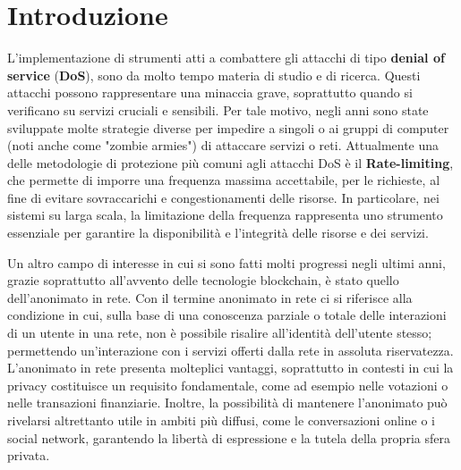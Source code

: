 \chapter*{Introduzione}
\label{chap:introduction}

L’implementazione di strumenti atti a combattere gli attacchi di tipo \textbf{denial of service} (\textbf{DoS}), sono da molto
tempo materia di studio e di ricerca. Questi attacchi possono rappresentare una minaccia grave, soprattutto quando si
verificano su servizi cruciali e sensibili. Per tale motivo, negli anni sono state sviluppate molte strategie diverse
per impedire a singoli o ai gruppi di computer (noti anche come "zombie armies") di attaccare servizi o reti.
Attualmente una delle metodologie di protezione più comuni agli attacchi DoS è il \textbf{Rate-limiting}, che permette
di imporre una frequenza massima accettabile, per le richieste, al fine di evitare sovraccarichi e congestionamenti delle
risorse. In particolare, nei sistemi su larga scala, la limitazione della frequenza rappresenta uno strumento essenziale
per garantire la disponibilità e l'integrità delle risorse e dei servizi.

Un altro campo di interesse in cui si sono fatti molti progressi negli ultimi anni, grazie soprattutto all'avvento delle
tecnologie blockchain, è stato quello dell’anonimato in rete. Con il termine anonimato in rete ci si riferisce alla
condizione in cui, sulla base di una conoscenza parziale o totale delle interazioni di un utente in una rete, non è
possibile risalire all'identità dell'utente stesso; permettendo un'interazione con i servizi offerti dalla rete in
assoluta riservatezza. L'anonimato in rete presenta molteplici vantaggi, soprattutto in contesti in cui la privacy
costituisce un requisito fondamentale, come ad esempio nelle votazioni o nelle transazioni finanziarie. Inoltre, la
possibilità di mantenere l'anonimato può rivelarsi altrettanto utile in ambiti più diffusi, come le conversazioni online
o i social network, garantendo la libertà di espressione e la tutela della propria sfera privata.


